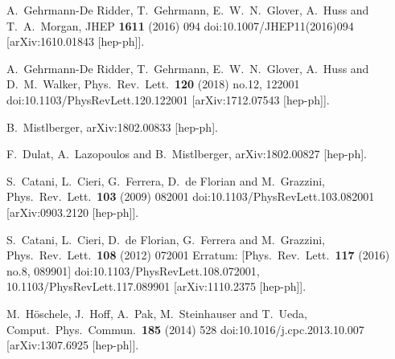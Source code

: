 \documentclass[12pt]{article}
\begin{document}
\begin{thebibliography}{99}
  A.~Gehrmann-De Ridder, T.~Gehrmann, E.~W.~N.~Glover, A.~Huss and T.~A.~Morgan,
  JHEP {\bf 1611} (2016) 094
  doi:10.1007/JHEP11(2016)094
  [arXiv:1610.01843 [hep-ph]].
  
  A.~Gehrmann-De Ridder, T.~Gehrmann, E.~W.~N.~Glover, A.~Huss and D.~M.~Walker,
  Phys.\ Rev.\ Lett.\  {\bf 120} (2018) no.12,  122001
  doi:10.1103/PhysRevLett.120.122001
  [arXiv:1712.07543 [hep-ph]].




  B.~Mistlberger,
  arXiv:1802.00833 [hep-ph].

  F.~Dulat, A.~Lazopoulos and B.~Mistlberger,
  arXiv:1802.00827 [hep-ph].
  
  S.~Catani, L.~Cieri, G.~Ferrera, D.~de Florian and M.~Grazzini,
  Phys.\ Rev.\ Lett.\  {\bf 103} (2009) 082001
  doi:10.1103/PhysRevLett.103.082001
  [arXiv:0903.2120 [hep-ph]].

  S.~Catani, L.~Cieri, D.~de Florian, G.~Ferrera and M.~Grazzini,
  Phys.\ Rev.\ Lett.\  {\bf 108} (2012) 072001
   Erratum: [Phys.\ Rev.\ Lett.\  {\bf 117} (2016) no.8,  089901]
  doi:10.1103/PhysRevLett.108.072001, 10.1103/PhysRevLett.117.089901
  [arXiv:1110.2375 [hep-ph]].

  M.~Höschele, J.~Hoff, A.~Pak, M.~Steinhauser and T.~Ueda,
  Comput.\ Phys.\ Commun.\  {\bf 185} (2014) 528
  doi:10.1016/j.cpc.2013.10.007
  [arXiv:1307.6925 [hep-ph]].
  

\end{thebibliography}
\end{document}

